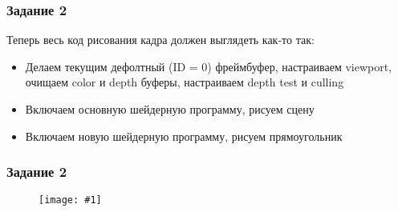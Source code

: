 \documentclass{beamer}
\newcommand{\slideimage}[1]{
  \begin{figure}
    \begin{adjustbox}{width=\textwidth, totalheight=\textheight-2\baselineskip-2\baselineskip,keepaspectratio}
      \texttt{[image: \#1]}
    \end{adjustbox}
  \end{figure}
}
\begin{document}
\begin{frame}[fragile]
\frametitle{Задание 2}
Теперь весь код рисования кадра должен выглядеть как-то так:
\begin{itemize}
\item Делаем текущим дефолтный (ID = 0) фреймбуфер, настраиваем viewport, очищаем color и depth буферы, настраиваем depth test и culling
\item Включаем основную шейдерную программу, рисуем сцену
\item Включаем новую шейдерную программу, рисуем прямоугольник
\end{itemize}
\end{frame}

\begin{frame}[fragile]
\frametitle{Задание 2}
\slideimage{2.png}
\end{frame}
\end{document}
